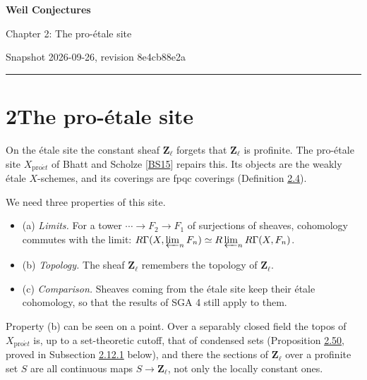 \documentclass[11pt]{article}
\begin{document}
\pagestyle{plain}
\begin{center}
{\LARGE\bfseries Weil Conjectures\par}
\vspace{0.7em}
{\large Chapter 2: The pro-étale site\par}
\vspace{0.5em}
{\small\color{bpmuted}Snapshot 2026-09-26, revision 8e4cb88e2a\par}
\end{center}
\vspace{0.5em}
{\small\tableofcontents}
\bigskip\hrule\bigskip

\section*{\texorpdfstring{2\quad The pro-étale site}{2 The pro-étale site}}
\label{bp1}%
\label{bp2}%
On the étale site the constant sheaf \(\mathbf Z_\ell\) forgets that \(\mathbf Z_\ell\) is profinite. The pro-étale site \(X_{\mathrm{pro}\acute{e}t}\) of Bhatt and Scholze [\hyperref[bp191]{BS15}] repairs this. Its objects are the weakly étale \(X\)-schemes, and its coverings are fpqc coverings (Definition \hyperref[bp12]{2.4}).

We need three properties of this site.

\begin{itemize}
\item (a) \emph{Limits.} For a tower \(\cdots\to F_2\to F_1\) of surjections of sheaves, cohomology commutes with the limit: \(R\Gamma(X,\varprojlim_nF_n)\simeq R\varprojlim_nR\Gamma(X,F_n)\).
\item (b) \emph{Topology.} The sheaf \(\mathbf Z_\ell\) remembers the topology of \(\mathbf Z_\ell\).
\item (c) \emph{Comparison.} Sheaves coming from the étale site keep their étale cohomology, so that the results of SGA 4 still apply to them.
\end{itemize}

Property (b) can be seen on a point. Over a separably closed field the topos of \(X_{\mathrm{pro}\acute{e}t}\) is, up to a set-theoretic cutoff, that of condensed sets (Proposition \hyperref[bp151]{2.50}, proved in Subsection \hyperref[bp149]{2.12.1} below), and there the sections of \(\mathbf Z_\ell\) over a profinite set \(S\) are all continuous maps \(S\to\mathbf Z_\ell\), not only the locally constant ones.
\end{document}
